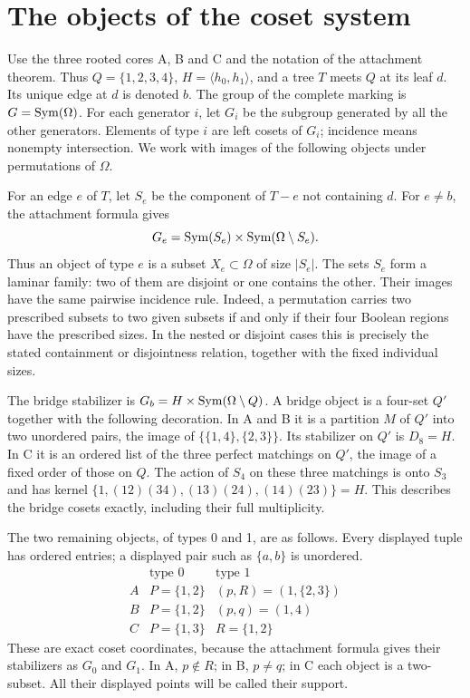 \section{The objects of the coset system}
Use the three rooted cores A, B and C and the notation of the attachment
theorem. Thus $Q=\{1,2,3,4\}$, $H=\langle h_0,h_1\rangle$, and a tree
$T$ meets $Q$ at its leaf $d$. Its unique edge at $d$ is denoted $b$.
The group of the complete marking is $G=\operatorname{Sym}(\Omega)$.
For each generator $i$, let $G_i$ be the subgroup generated by all the
other generators. Elements of type $i$ are left cosets of $G_i$;
incidence means nonempty intersection. We work with images of the
following objects under permutations of $\Omega$.

For an edge $e$ of $T$, let $S_e$ be the component of $T-e$ not containing
$d$. For $e\ne b$, the attachment formula gives
\[
G_e=\operatorname{Sym}(S_e)\times\operatorname{Sym}(\Omega\setminus S_e).
\]
Thus an object of type $e$ is a subset $X_e\subset\Omega$ of size $|S_e|$.
The sets $S_e$ form a laminar family: two of them are disjoint or one
contains the other. Their images have the same pairwise incidence rule.
Indeed, a permutation carries two prescribed subsets to two given subsets
if and only if their four Boolean regions have the prescribed sizes.
In the nested or disjoint cases this is precisely the stated containment
or disjointness relation, together with the fixed individual sizes.

The bridge stabilizer is $G_b=H\times\operatorname{Sym}(\Omega\setminus Q)$.
A bridge object is a four-set $Q'$ together with the following decoration.
In A and B it is a partition $M$ of $Q'$ into two unordered pairs,
the image of $\{\{1,4\},\{2,3\}\}$. Its stabilizer on $Q'$ is $D_8=H$.
In C it is an ordered list of the three perfect matchings on $Q'$,
the image of a fixed order of those on $Q$.
The action of $S_4$ on these three matchings is onto $S_3$ and has
kernel $\{1,(12)(34),(13)(24),(14)(23)\}=H$.
This describes the bridge cosets exactly, including their full multiplicity.

The two remaining objects, of types 0 and 1, are as follows.
Every displayed tuple has ordered entries; a displayed pair such as
$\{a,b\}$ is unordered.
\[
\begin{array}{c|cc}
 &\text{type }0&\text{type }1\\\hline
 A& P=\{1,2\}&(p,R)=(1,\{2,3\})\\
 B& P=\{1,2\}&(p,q)=(1,4)\\
 C& P=\{1,3\}&R=\{1,2\}
\end{array}
\]
These are exact coset coordinates, because the attachment formula gives
their stabilizers as $G_0$ and $G_1$. In A, $p\notin R$; in B,
$p\ne q$; in C each object is a two-subset. All their displayed points
will be called their support.

